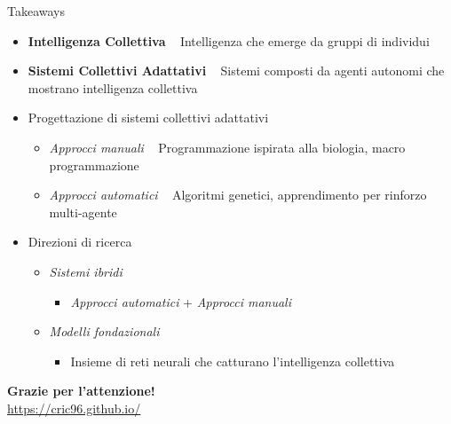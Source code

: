 \documentclass[presentation, 10pt,aspectratio=169]{beamer}\mode<presentation>{\usetheme{AMSBolognaFC}}
\begin{document}
\begin{frame}{Takeaways}
	\begin{itemize}
		\item \textbf{Intelligenza Collettiva} \faArrowRight ~ Intelligenza che emerge da gruppi di individui
		\item \textbf{Sistemi Collettivi Adattativi} \faArrowRight ~ Sistemi composti da agenti autonomi che mostrano intelligenza collettiva
		\item Progettazione di sistemi collettivi adattativi
		\begin{itemize}
			\item \emph{Approcci manuali} \faArrowRight ~ Programmazione ispirata alla biologia, macro programmazione
			\item \emph{Approcci automatici} \faArrowRight ~ Algoritmi genetici, apprendimento per rinforzo multi-agente
		\end{itemize}
		\item Direzioni di ricerca
		\begin{itemize}
			\item \emph{Sistemi ibridi}
			\begin{itemize}
				\item \emph{Approcci automatici} + \emph{Approcci manuali}
			\end{itemize}
			\item \emph{Modelli fondazionali}
			\begin{itemize}
				\item Insieme di reti neurali che catturano l'intelligenza collettiva
			\end{itemize}
		\end{itemize}
	\end{itemize}
\end{frame}

{

	
	\begin{frame}[c]
		
		{
		\color{customfg}
	
		\begin{center}
		\Large\textbf{Grazie per l'attenzione!} \\
	
		\large{\url{https://cric96.github.io/}}

		\end{center}
	
		\vspace{1cm}	
	}
\end{frame}
}




\end{document}
